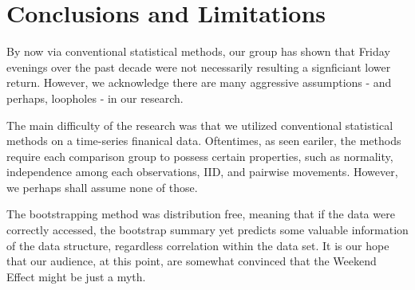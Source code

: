 \documentclass[letterpaper,10pt,english]{/Users/edwsurewin/anaconda/lib/python2.7/site-packages/sphinx/texinputs/sphinxhowto}
\begin{document}
        
    
\section{Conclusions and Limitations}\label{conclusions-and-limitations}

By now via conventional statistical methods, our group has shown that
Friday evenings over the past decade were not necessarily resulting a
signficiant lower return. However, we acknowledge there are many
aggressive assumptions - and perhaps, loopholes - in our research.

The main difficulty of the research was that we utilized conventional
statistical methods on a time-series finanical data. Oftentimes, as seen
eariler, the methods require each comparison group to possess certain
properties, such as normality, independence among each observations,
IID, and pairwise movements. However, we perhaps shall assume none of
those.

The bootstrapping method was distribution free, meaning that if the data
were correctly accessed, the bootstrap summary yet predicts some
valuable information of the data structure, regardless correlation
within the data set. It is our hope that our audience, at this point,
are somewhat convinced that the Weekend Effect might be just a myth.
        

        \renewcommand{\indexname}{Index}
        \printindex

    
\end{document}
